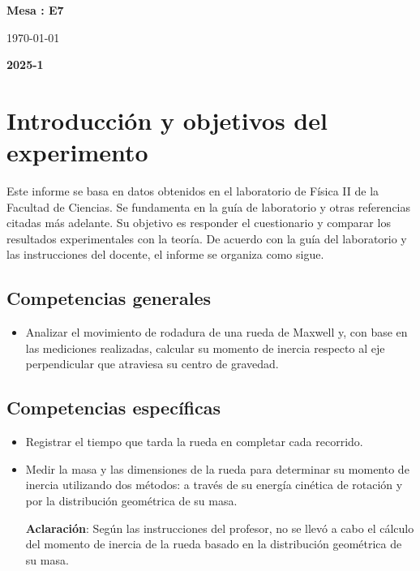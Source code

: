 \documentclass[10pt]{article}
\begin{document}
\begin{center}
\vspace{-2.4cm}	
\begin{minipage}{0.98\textwidth}
\begin{flushright}	
        \textbf{Mesa : E7}
\end{flushright}
\end{minipage}

 \vspace{2.4cm}

\large{\today}\\
\vspace{0.3cm}

{ \Large\bfseries 2025-1}
										 			
\end{center}							 											
																					
\newpage																		

\tableofcontents 
\newpage																		

\section{Introducción y objetivos del experimento}
Este informe se basa en datos obtenidos en el laboratorio de Física II de la Facultad de Ciencias. Se fundamenta en la guía de laboratorio y otras referencias citadas más adelante. Su objetivo es responder el cuestionario y comparar los resultados experimentales con la teoría. De acuerdo con la guía del laboratorio y las instrucciones del docente, el informe se organiza como sigue.

\subsection{Competencias generales}
\begin{itemize}
  \item Analizar el movimiento de rodadura de una rueda de Maxwell y, con base en las mediciones realizadas, calcular su momento de inercia respecto al eje perpendicular que atraviesa su centro de gravedad.
\end{itemize}

\subsection{Competencias específicas}
\begin{itemize}
        \item Registrar el tiempo que tarda la rueda en completar cada recorrido.

        \item Medir la masa y las dimensiones de la rueda para determinar su momento de inercia utilizando dos métodos: a través de su energía cinética de rotación y por la distribución geométrica de su masa.

                \textbf{Aclaración}: Según las instrucciones del profesor, no se llevó a cabo el cálculo del momento de inercia de la rueda basado en la distribución geométrica de su masa.
\end{itemize}
\end{document}
